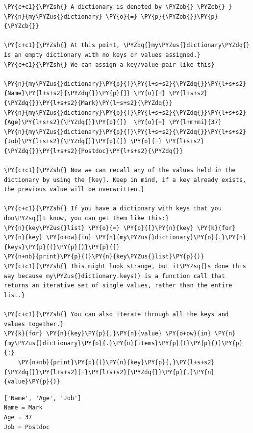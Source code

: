     \begin{tcolorbox}[breakable, size=fbox, boxrule=1pt, pad at break*=1mm,colback=cellbackground, colframe=cellborder]
\begin{Verbatim}[commandchars=\\\{\}]
\PY{c+c1}{\PYZsh{} A dictionary is denoted by \PYZob{} \PYZcb{} }
\PY{n}{my\PYZus{}dictionary} \PY{o}{=} \PY{p}{\PYZob{}}\PY{p}{\PYZcb{}}

\PY{c+c1}{\PYZsh{} At this point, \PYZdq{}my\PYZus{}dictionary\PYZdq{} is an empty dictionary with no keys or values assigned.}
\PY{c+c1}{\PYZsh{} We can assign a key/value pair like this}

\PY{n}{my\PYZus{}dictionary}\PY{p}{[}\PY{l+s+s2}{\PYZdq{}}\PY{l+s+s2}{Name}\PY{l+s+s2}{\PYZdq{}}\PY{p}{]} \PY{o}{=} \PY{l+s+s2}{\PYZdq{}}\PY{l+s+s2}{Mark}\PY{l+s+s2}{\PYZdq{}}
\PY{n}{my\PYZus{}dictionary}\PY{p}{[}\PY{l+s+s2}{\PYZdq{}}\PY{l+s+s2}{Age}\PY{l+s+s2}{\PYZdq{}}\PY{p}{]}  \PY{o}{=} \PY{l+m+mi}{37}
\PY{n}{my\PYZus{}dictionary}\PY{p}{[}\PY{l+s+s2}{\PYZdq{}}\PY{l+s+s2}{Job}\PY{l+s+s2}{\PYZdq{}}\PY{p}{]} \PY{o}{=} \PY{l+s+s2}{\PYZdq{}}\PY{l+s+s2}{Postdoc}\PY{l+s+s2}{\PYZdq{}}

\PY{c+c1}{\PYZsh{} Now we can recall any of the values held in the dictionary by using the [key]. Keep in mind, if a key already exists, the previous value will be overwritten.}

\PY{c+c1}{\PYZsh{} If you have a dictionary with keys that you don\PYZsq{}t know, you can get them like this:}
\PY{n}{key\PYZus{}list} \PY{o}{=} \PY{p}{[}\PY{n}{key} \PY{k}{for} \PY{n}{key} \PY{o+ow}{in} \PY{n}{my\PYZus{}dictionary}\PY{o}{.}\PY{n}{keys}\PY{p}{(}\PY{p}{)}\PY{p}{]}
\PY{n+nb}{print}\PY{p}{(}\PY{n}{key\PYZus{}list}\PY{p}{)}
\PY{c+c1}{\PYZsh{} This might look strange, but it\PYZsq{}s done this way because my\PYZus{}dictionary.keys() is a function call that returns an iterative set of single values, rather than the entire list.}

\PY{c+c1}{\PYZsh{} You can also iterate through all the keys and values together.}
\PY{k}{for} \PY{n}{key}\PY{p}{,}\PY{n}{value} \PY{o+ow}{in} \PY{n}{my\PYZus{}dictionary}\PY{o}{.}\PY{n}{items}\PY{p}{(}\PY{p}{)}\PY{p}{:}
    \PY{n+nb}{print}\PY{p}{(}\PY{n}{key}\PY{p}{,}\PY{l+s+s2}{\PYZdq{}}\PY{l+s+s2}{=}\PY{l+s+s2}{\PYZdq{}}\PY{p}{,}\PY{n}{value}\PY{p}{)}
\end{Verbatim}
\end{tcolorbox}

    \begin{Verbatim}[commandchars=\\\{\}]
['Name', 'Age', 'Job']
Name = Mark
Age = 37
Job = Postdoc
    \end{Verbatim}


